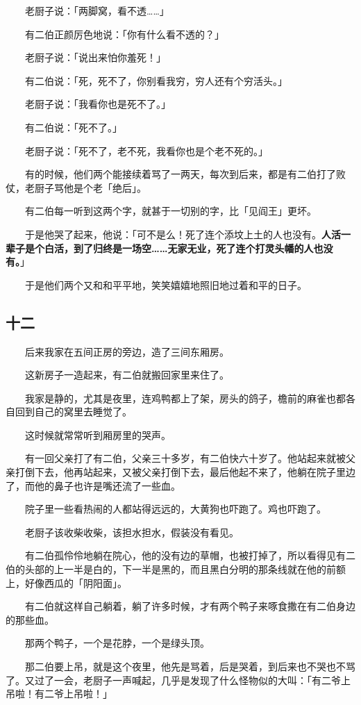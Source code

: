 \documentclass[UTF8]{ctexart}
\begin{document}
　　老厨子说：「两脚窝，看不透……」

　　有二伯正颜厉色地说：「你有什么看不透的？」

　　老厨子说：「说出来怕你羞死！」

　　有二伯说：「死，死不了，你别看我穷，穷人还有个穷活头。」

　　老厨子说：「我看你也是死不了。」

　　有二伯说：「死不了。」

　　老厨子说：「死不了，老不死，我看你也是个老不死的。」

　　有的时候，他们两个能接续着骂了一两天，每次到后来，都是有二伯打了败仗，老厨子骂他是个老「绝后」。

　　有二伯每一听到这两个字，就甚于一切别的字，比「见阎王」更坏。

　　于是他哭了起来，他说：「可不是么！死了连个添坟上土的人也没有。\textbf{人活一辈子是个白活，到了归终是一场空……无家无业，死了连个打灵头幡的人也没有。}」

　　于是他们两个又和和平平地，笑笑嬉嬉地照旧地过着和平的日子。

\subsection{十二}

　　后来我家在五间正房的旁边，造了三间东厢房。

　　这新房子一造起来，有二伯就搬回家里来住了。

　　我家是静的，尤其是夜里，连鸡鸭都上了架，房头的鸽子，檐前的麻雀也都各自回到自己的窝里去睡觉了。

　　这时候就常常听到厢房里的哭声。

　　有一回父亲打了有二伯，父亲三十多岁，有二伯快六十岁了。他站起来就被父亲打倒下去，他再站起来，又被父亲打倒下去，最后他起不来了，他躺在院子里边了，而他的鼻子也许是嘴还流了一些血。

　　院子里一些看热闹的人都站得远远的，大黄狗也吓跑了。鸡也吓跑了。

　　老厨子该收柴收柴，该担水担水，假装没有看见。

　　有二伯孤伶伶地躺在院心，他的没有边的草帽，也被打掉了，所以看得见有二伯的头部的上一半是白的，下一半是黑的，而且黑白分明的那条线就在他的前额上，好像西瓜的「阴阳面」。

　　有二伯就这样自己躺着，躺了许多时候，才有两个鸭子来啄食撒在有二伯身边的那些血。

　　那两个鸭子，一个是花脖，一个是绿头顶。

　　那二伯要上吊，就是这个夜里，他先是骂着，后是哭着，到后来也不哭也不骂了。又过了一会，老厨子一声喊起，几乎是发现了什么怪物似的大叫：「有二爷上吊啦！有二爷上吊啦！」
\end{document}
